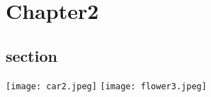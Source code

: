 \documentclass[../Lat-Book/Lat-Book.tex]{subfiles}
\begin{document}
\INIT

\chapter{Chapter2}

\section{section}
\texttt{[image: car2.jpeg]}
\texttt{[image: flower3.jpeg]}
\end{document}
